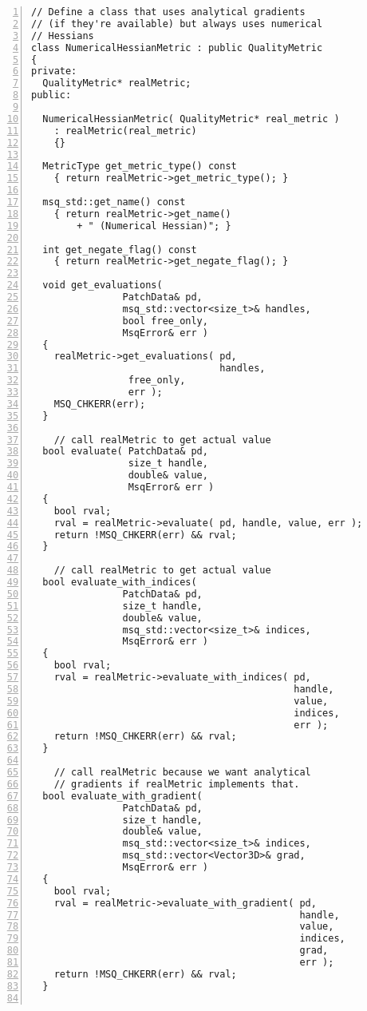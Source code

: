 \documentclass{article}
\begin{document}
\begin{lstlisting}[numbers=left,caption={Numerical \texttt{QualityMetric} Wrapper},label={lst:numerical}] 
// Define a class that uses analytical gradients 
// (if they're available) but always uses numerical
// Hessians
class NumericalHessianMetric : public QualityMetric
{
private:
  QualityMetric* realMetric;
public:
  
  NumericalHessianMetric( QualityMetric* real_metric )
    : realMetric(real_metric)
    {}
  
  MetricType get_metric_type() const
    { return realMetric->get_metric_type(); }
  
  msq_std::get_name() const
    { return realMetric->get_name() 
        + " (Numerical Hessian)"; }
  
  int get_negate_flag() const
    { return realMetric->get_negate_flag(); }
  
  void get_evaluations( 
                PatchData& pd,
                msq_std::vector<size_t>& handles,
                bool free_only,
                MsqError& err )
  {
    realMetric->get_evaluations( pd, 
                                 handles, 
				 free_only, 
				 err );
    MSQ_CHKERR(err);
  }
  
    // call realMetric to get actual value
  bool evaluate( PatchData& pd,
                 size_t handle,
                 double& value,
                 MsqError& err )
  {
    bool rval;
    rval = realMetric->evaluate( pd, handle, value, err );
    return !MSQ_CHKERR(err) && rval;
  }
  
    // call realMetric to get actual value
  bool evaluate_with_indices( 
                PatchData& pd,
                size_t handle,
                double& value,
                msq_std::vector<size_t>& indices,
                MsqError& err )
  {
    bool rval;
    rval = realMetric->evaluate_with_indices( pd,
                                              handle,
                                              value,
                                              indices,
                                              err );
    return !MSQ_CHKERR(err) && rval;
  }
  
    // call realMetric because we want analytical 
    // gradients if realMetric implements that.
  bool evaluate_with_gradient( 
                PatchData& pd,
                size_t handle,
                double& value,
                msq_std::vector<size_t>& indices,
                msq_std::vector<Vector3D>& grad,
                MsqError& err )
  {
    bool rval;
    rval = realMetric->evaluate_with_gradient( pd,
                                               handle,
                                               value,
                                               indices,
                                               grad,
                                               err );
    return !MSQ_CHKERR(err) && rval;
  }
    

\end{lstlisting}
\end{document}
